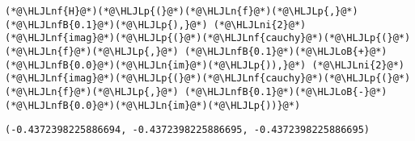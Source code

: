 \documentclass[12pt,a4paper]{article}
\newcommand{\HLJLn}[1]{#1}
\newcommand{\HLJLnf}[1]{\textcolor[RGB]{66,102,213}{#1}}
\newcommand{\HLJLnfB}[1]{\textcolor[RGB]{59,151,46}{#1}}
\newcommand{\HLJLni}[1]{\textcolor[RGB]{59,151,46}{#1}}
\newcommand{\HLJLoB}[1]{\textcolor[RGB]{102,102,102}{\textbf{#1}}}
\newcommand{\HLJLp}[1]{#1}
\begin{document}
\begin{lstlisting}
(*@\HLJLnf{H}@*)(*@\HLJLp{(}@*)(*@\HLJLn{f}@*)(*@\HLJLp{,}@*) (*@\HLJLnfB{0.1}@*)(*@\HLJLp{),}@*) (*@\HLJLni{2}@*)(*@\HLJLnf{imag}@*)(*@\HLJLp{(}@*)(*@\HLJLnf{cauchy}@*)(*@\HLJLp{(}@*)(*@\HLJLn{f}@*)(*@\HLJLp{,}@*) (*@\HLJLnfB{0.1}@*)(*@\HLJLoB{+}@*)(*@\HLJLnfB{0.0}@*)(*@\HLJLn{im}@*)(*@\HLJLp{)),}@*) (*@\HLJLni{2}@*)(*@\HLJLnf{imag}@*)(*@\HLJLp{(}@*)(*@\HLJLnf{cauchy}@*)(*@\HLJLp{(}@*)(*@\HLJLn{f}@*)(*@\HLJLp{,}@*) (*@\HLJLnfB{0.1}@*)(*@\HLJLoB{-}@*)(*@\HLJLnfB{0.0}@*)(*@\HLJLn{im}@*)(*@\HLJLp{))}@*)
\end{lstlisting}

\begin{lstlisting}
(-0.4372398225886694, -0.4372398225886695, -0.4372398225886695)
\end{lstlisting}
\end{document}
